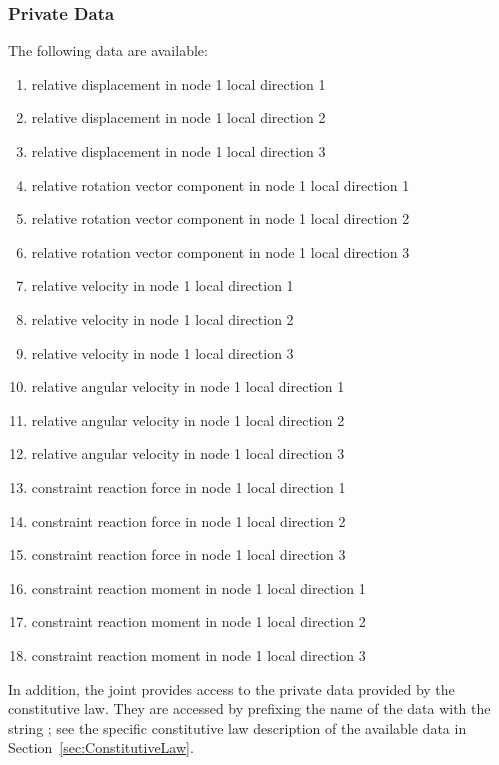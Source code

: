 \subsubsection{Private Data}
The following data are available:
\begin{enumerate}
\item {} relative displacement in node 1 local direction 1
\item {} relative displacement in node 1 local direction 2
\item {} relative displacement in node 1 local direction 3
\item {} relative rotation vector component in node 1 local direction 1
\item {} relative rotation vector component in node 1 local direction 2
\item {} relative rotation vector component in node 1 local direction 3
\item {} relative velocity in node 1 local direction 1
\item {} relative velocity in node 1 local direction 2
\item {} relative velocity in node 1 local direction 3
\item {} relative angular velocity in node 1 local direction 1
\item {} relative angular velocity in node 1 local direction 2
\item {} relative angular velocity in node 1 local direction 3
\item {} constraint reaction force in node 1 local direction 1
\item {} constraint reaction force in node 1 local direction 2
\item {} constraint reaction force in node 1 local direction 3
\item {} constraint reaction moment in node 1 local direction 1
\item {} constraint reaction moment in node 1 local direction 2
\item {} constraint reaction moment in node 1 local direction 3
\end{enumerate}
In addition, the joint provides
access to the private data provided by the constitutive law.
They are accessed by prefixing the name of the data with the string
; see the specific constitutive law
description of the available data in Section~\ref{sec:ConstitutiveLaw}.

